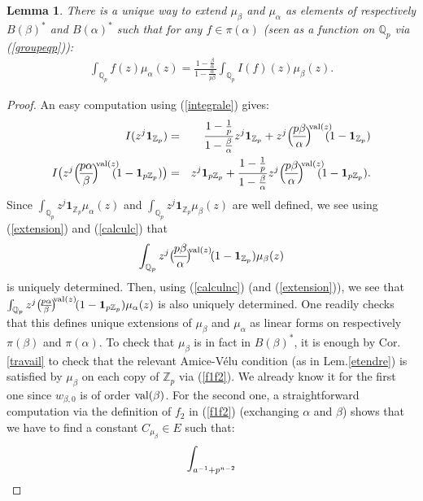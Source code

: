 \documentclass[11pt]{amsart}
\def\Z{{\mathbb Z}_p}
\def\Q{{\mathbb Q}_p}
\newtheorem{lem}[definit]{\bf{Lemma}}
\begin{document}
\begin{lem}\label{versfin} 
There is a unique way to extend $\mu_{\beta}$ and $\mu_{\alpha}$ as
elements of respectively $B(\beta)^*$ and $B(\alpha)^*$ such that for
any $f\in \pi(\alpha)$ (seen as a function on $\Q$ via
(\ref{groupeqp})):  
\begin{eqnarray}\label{extension} 
\int_{\Q}f(z)\mu_{\alpha}(z)=\frac{1-\frac{\beta}{\alpha}}
{1-\frac{\alpha}{p\beta}}\int_{\Q}I(f)(z)\mu_{\beta}(z). 
\end{eqnarray} 
\end{lem} 
\begin{proof} 
An easy computation using (\ref{integrale}) gives: 
\begin{eqnarray}\label{calculc} 
I(z^j{\mathbf 1}_{\Z})&=&\frac{1-\frac{1}{p}}{1-\frac{\beta}
{\alpha}}z^j{\mathbf 1}_{\Z}+z^j\Big(\!\frac{p\beta}
{\alpha}\!\Big)^{\!\!{\rm val}(z)}\!\!\!\!(1-{\mathbf 1}_{\Z})\\
\label{calculnc}
I\big(z^j\Big(\!\frac{p\alpha}{\beta}\!\Big)^{\!\!{\rm val}
(z)}\!\!\!\!(1-{\mathbf 1}_{p\Z})\big)&=&z^j{\mathbf
  1}_{p\Z}+\frac{1-\frac{1}{p}}{1-\frac{\beta}{\alpha}}z^j
\Big(\!\frac{p\beta}{\alpha}\!\Big)^{\!\!{\rm val}(z)}\!\!\!\!(1-{\mathbf 1}_{p\Z}). 
\end{eqnarray} 
Since $\int_{\Q}z^j{\mathbf 1}_{\Z}\mu_{\alpha}(z)$ and
$\int_{\Q}z^j{\mathbf 1}_{\Z}\mu_{\beta}(z)$ are well defined, we see
using (\ref{extension}) and (\ref{calculc}) that
$$\int_{\Q}z^j\big(\!\frac{p\beta}{\alpha}\!\big)^{\!\!{\rm
    val}(z)}\!(1-{\mathbf 1}_{\Z})\mu_{\beta}(z)$$ is uniquely
determined. Then, using (\ref{calculnc}) (and (\ref{extension})), we
see that $\int_{\Q}z^j\big(\!\frac{p\alpha}{\beta}\!\big)^{\!\!{\rm
    val}(z)}\!(1-{\mathbf 1}_{p\Z})\mu_{\alpha}(z)$ is also uniquely
determined. One readily checks that this defines unique extensions of
$\mu_{\beta}$ and $\mu_{\alpha}$ as linear forms on respectively
$\pi(\beta)$ and $\pi(\alpha)$. To check that $\mu_{\beta}$ is in fact
in $B(\beta)^*$, it is enough by Cor.\ref{travail} to check that the
relevant Amice-V\'elu condition (as in Lem.\ref{etendre}) is satisfied
by $\mu_{\beta}$ on each copy of $\Z$ via (\ref{f1f2}). We already
know it for the first one since $w_{\beta,0}$ is of order ${\rm
  val}(\beta)$. For the second one, a straightforward computation via
the definition of $f_2$ in (\ref{f1f2}) (exchanging $\alpha$ and
$\beta$) shows that we have to find a constant $C_{\mu_{\beta}}\in E$
such that:  
\begin{eqnarray}\label{ch1} 
\int_{a^{-1}+p^{n-2{\rm
}}}
\end{eqnarray}
\end{proof}
\end{document}
